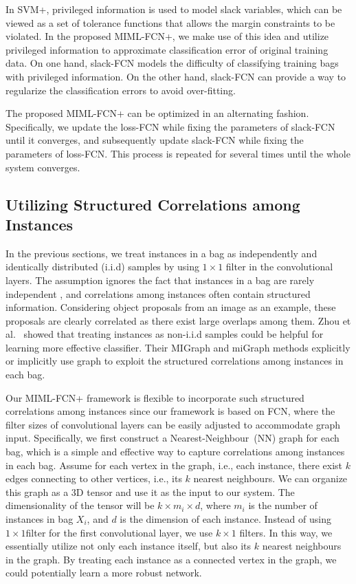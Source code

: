\documentclass[10pt,twocolumn,letterpaper]{article}
\begin{document}
In SVM+, privileged information is used to model slack variables,
which can be viewed as a set of tolerance functions that allows
the margin constraints to be violated. In the proposed
\textsc{MIML-FCN+}, we make use of this idea and utilize
privileged information to approximate classification error of
original training data. On one hand, slack-FCN models the
difficulty of classifying training bags with privileged
information. On the other hand, slack-FCN can provide a way to
regularize the classification errors to avoid over-fitting.

The proposed \textsc{MIML-FCN+} can be optimized in an alternating
fashion. Specifically, we update the loss-FCN while fixing the
parameters of slack-FCN until it converges, and subsequently
update slack-FCN while fixing the parameters of loss-FCN. This
process is repeated for several times until the whole system
converges.

\subsection{Utilizing Structured Correlations among Instances}
\label{graph} In the previous sections, we treat instances in a
bag as independently and identically distributed (i.i.d) samples
by using $1 \times 1$ filter in the convolutional layers. The
assumption ignores the fact that instances in a bag are rarely
independent , and correlations among instances often contain
structured information. Considering object proposals from an image
as an example, these proposals are clearly correlated as there
exist large overlaps among them. Zhou et al.~\cite{Zhou2009}
showed that treating instances as non-i.i.d samples could be
helpful for learning more effective classifier. Their MIGraph and
miGraph methods explicitly or implicitly use graph to exploit the
structured correlations among instances in each bag.

Our MIML-FCN+ framework is flexible to incorporate such structured
correlations among instances since our framework is based on FCN,
where the filter sizes of convolutional layers can be easily
adjusted to accommodate graph input. Specifically, we first
construct a Nearest-Neighbour~(NN) graph for each bag, which is a
simple and effective way to capture correlations among instances
in each bag. Assume for each vertex in the graph, i.e., each
instance, there exist $k$ edges connecting to other vertices,
i.e., its $k$ nearest neighbours. We can organize this graph as a
$3$D tensor and use it as the input to our system. The
dimensionality of the tensor will be $k \times m_i \times d$,
where $m_i$ is the number of instances in bag $X_i$, and $d$ is
the dimension of each instance. Instead of using $1\times 1$filter
for the first convolutional layer, we use $k\times 1$ filters. In
this way, we essentially utilize not only each instance itself,
but also its $k$ nearest neighbours in the graph. By treating each
instance as a connected vertex in the graph, we could potentially
learn a more robust network.
\end{document}
